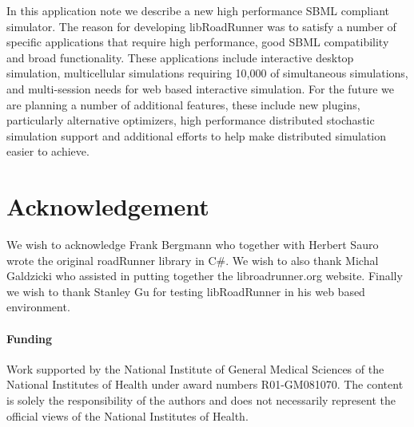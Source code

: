 \documentclass{bioinfo}
\begin{document}
In this application note we describe a new high performance SBML compliant simulator. The reason for developing libRoadRunner was to satisfy a number of specific applications that require high performance, good SBML compatibility and broad functionality. These applications include interactive desktop simulation, multicellular simulations requiring 10,000 of simultaneous simulations, and multi-session needs for web based interactive simulation.  For the future we are planning a number of additional features, these include new plugins, particularly alternative optimizers, high performance distributed stochastic simulation support and additional efforts to help make distributed simulation easier to achieve.

\section*{Acknowledgement}
We wish to acknowledge Frank Bergmann who together with Herbert Sauro wrote the original roadRunner library in C\#. We wish to also thank Michal Galdzicki who assisted in putting together the libroadrunner.org website. Finally we wish to thank Stanley Gu for testing libRoadRunner in his web based environment.

\paragraph{Funding\textcolon} Work supported by the National Institute of General Medical Sciences of the National Institutes of Health under award numbers R01-GM081070. The content is solely the responsibility of the authors and does not necessarily represent the official views of the National Institutes of Health.

%
%
%
%
%
%
%
%
%
\end{document}
